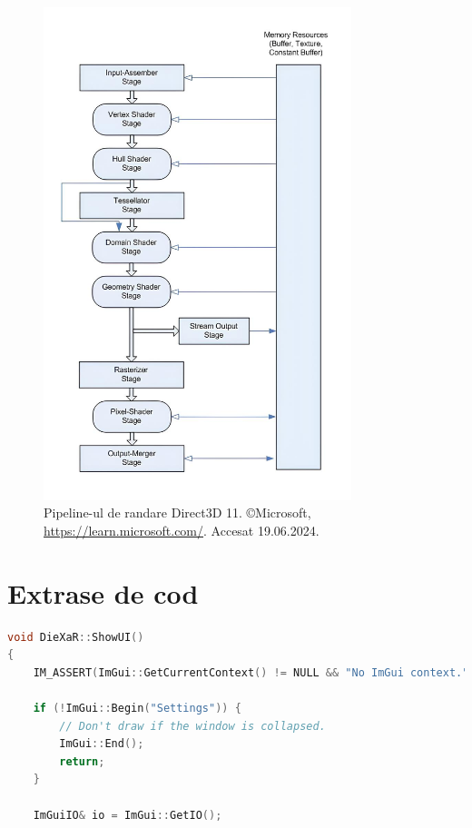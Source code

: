 \documentclass[12pt,a4paper]{report}
\numberwithin{equation}{section} %
\begin{document}
\begin{appendices}
	\begin{figure}
		\centering
		\includegraphics[width=0.8\textwidth]{pics/pipeline.jpg}
		\caption{Pipeline-ul de randare Direct3D 11. \copyright Microsoft, \url{https://learn.microsoft.com/}. Accesat 19.06.2024.}
		\label{fig:pipeline}
	\end{figure}

	\chapter{Extrase de cod} %

	\begin{lstlisting}[caption={Compunerea meniului ImGui},label={lst:showui},language=C++]
void DieXaR::ShowUI()
{
	IM_ASSERT(ImGui::GetCurrentContext() != NULL && "No ImGui context.");

	if (!ImGui::Begin("Settings")) {
		// Don't draw if the window is collapsed.
		ImGui::End();
		return;
	}

	ImGuiIO& io = ImGui::GetIO();


\end{lstlisting}
\end{appendices}
\end{document}
